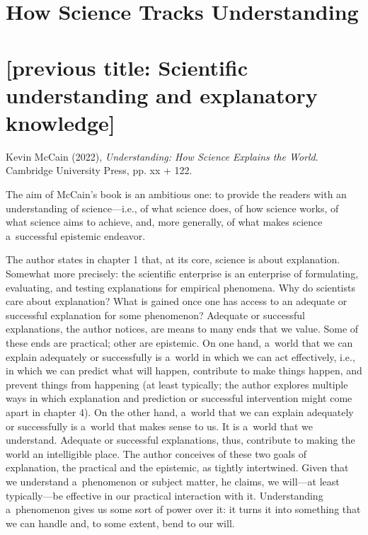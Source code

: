 \setcounter{secnumdepth}{0}

\pagestyle{Standard}


\section*{How Science Tracks Understanding}
\section{[previous title: Scientific understanding and explanatory knowledge\textrm{]}}
Kevin McCain (2022), \textit{Understanding: How Science Explains the World}. Cambridge University Press, pp. xx + 122.

The aim of McCain's book is an ambitious one: to provide the readers with an understanding of science---i.e., of what science does, of how science works, of what science aims to achieve, and, more generally, of what makes science a~successful epistemic endeavor.

The author states in chapter 1 that, at its core, science is about explanation. Somewhat more precisely: the scientific enterprise is an enterprise of formulating, evaluating, and testing explanations for empirical phenomena. Why do scientists care about explanation? What is gained once one has access to an adequate or successful explanation for some phenomenon? Adequate or successful explanations, the author notices, are means to many ends that we value. Some of these ends are practical; other are epistemic. On one hand, a~world that we can explain adequately or successfully is a~world in which we can act effectively, i.e., in which we can predict what will happen, contribute to make things happen, and prevent things from happening (at least typically; the author explores multiple ways in which explanation and prediction or successful intervention might come apart in chapter 4). On the other hand, a~world that we can explain adequately or successfully is a~world that makes sense to us. It is a~world that we understand. Adequate or successful explanations, thus, contribute to making the world an intelligible place. The author conceives of these two goals of explanation, the practical and the epistemic, as tightly intertwined. Given that we understand a~phenomenon or subject matter, he claims, we will---at least typically---be effective in our practical interaction with it. Understanding a~phenomenon gives us some sort of power over it: it turns it into something that we can handle and, to some extent, bend to our will.

